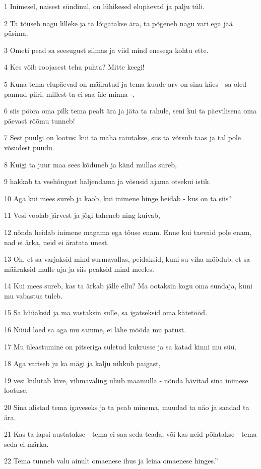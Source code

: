 \par 1 Inimesel, naisest sündinul, on lühikesed elupäevad ja palju tüli.
\par 2 Ta tõuseb nagu lilleke ja ta lõigatakse ära, ta põgeneb nagu vari ega jää püsima.
\par 3 Ometi pead sa seesugust silmas ja viid mind enesega kohtu ette.
\par 4 Kes võib roojasest teha puhta? Mitte keegi!
\par 5 Kuna tema elupäevad on määratud ja tema kuude arv on sinu käes - sa oled pannud piiri, millest ta ei saa üle minna -,
\par 6 siis pööra oma pilk tema pealt ära ja jäta ta rahule, seni kui ta päevilisena oma päevast rõõmu tunneb!
\par 7 Sest puulgi on lootus: kui ta maha raiutakse, siis ta võrsub taas ja tal pole võsudest puudu.
\par 8 Kuigi ta juur maa sees kõduneb ja känd mullas sureb,
\par 9 hakkab ta veehõngust haljendama ja võsusid ajama otsekui istik.
\par 10 Aga kui mees sureb ja kaob, kui inimene hinge heidab - kus on ta siis?
\par 11 Vesi voolab järvest ja jõgi taheneb ning kuivab,
\par 12 nõnda heidab inimene magama ega tõuse enam. Enne kui taevaid pole enam, nad ei ärka, neid ei äratata unest.
\par 13 Oh, et sa varjaksid mind surmavallas, peidaksid, kuni su viha möödub; et sa määraksid mulle aja ja siis peaksid mind meeles.
\par 14 Kui mees sureb, kas ta ärkab jälle ellu? Ma ootaksin kogu oma sundaja, kuni mu vabastus tuleb.
\par 15 Sa hüüaksid ja ma vastaksin sulle, sa igatseksid oma kätetööd.
\par 16 Nüüd loed sa aga mu samme, ei lähe mööda mu patust.
\par 17 Mu üleastumine on pitseriga suletud kukrusse ja sa katad kinni mu süü.
\par 18 Aga variseb ju ka mägi ja kalju nihkub paigast,
\par 19 vesi kulutab kive, vihmavaling uhub maamulla - nõnda hävitad sina inimese lootuse.
\par 20 Sina alistad tema igaveseks ja ta peab minema, muudad ta näo ja saadad ta ära.
\par 21 Kas ta lapsi austatakse - tema ei saa seda teada, või kas neid põlatakse - tema seda ei märka.
\par 22 Tema tunneb valu ainult omaenese ihus ja leina omaenese hinges.”

